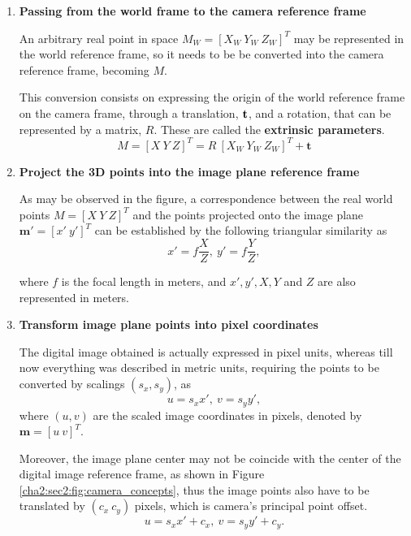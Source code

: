 \begin{enumerate}
	\item \textbf{Passing from the world frame to the camera reference frame}
	
	An arbitrary real point in space $M_W = [X_W \ Y_W \ Z_W]^T$ may be represented in the world reference frame, so it needs to be be converted into the camera reference frame, becoming $M$.
	
	This conversion consists on expressing the origin of the world reference frame on the camera frame, through a translation, $\bf t$, and a rotation, that can be represented by a matrix, $R$. These are called the \textbf{extrinsic parameters}.
	\begin{equation}
		M = [X \ Y \ Z]^T = R \ [X_W \ Y_W \ Z_W]^T + \mathbf{t}
	\end{equation}
	
	\item \textbf{Project the 3D points into the image plane reference frame}
	
	As may be observed in the figure, a correspondence between the real world points $M = [X \ Y \ Z]^T$ and the points projected onto the image plane $\mathbf{m'} = [x' \ y']^T$ can be established by the following triangular similarity as
	\begin{equation}
	\label{cha2:sec2:eq:trisimilar}
	x' = f\frac{X}{Z}, \ y' = f\frac{Y}{Z},
	\end{equation}
	
	where $f$ is the focal length in meters, and $x', y', X ,Y$ and $Z$ are also represented in meters.	
	
	\item \textbf{Transform image plane points into pixel coordinates}
	
	The digital image obtained is actually expressed in pixel units, whereas till now everything was described in metric units, requiring the points to be converted by scalings $(s_x, s_y)$, as 
	\begin{equation}
	\label{cha2:sec2:eq:trisimilar}
	u = s_x x', \ v = s_y y',
	\end{equation}
	where $(u,v)$ are the scaled image coordinates in pixels, denoted by $\mathbf{m} = [u \ v]^T$.
	
	Moreover, the image plane center may not be coincide with the center of the digital image reference frame, as shown in Figure \ref{cha2:sec2:fig:camera_concepts}, thus the image points also have to be translated by $(c_x \ c_y)$ pixels, which is camera's principal point offset. 
	\begin{equation}
	\label{cha2:sec2:eq:trisimilar}
	u = s_x x' + c_x, \ v = s_y y' + c_y.
	\end{equation}
	

\end{enumerate}
